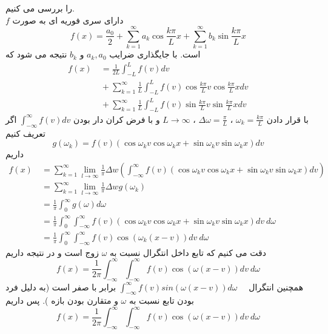 را بررسی می کنیم.\\
$f$
دارای سری فوریه ای به صورت
\[
f(x)=\frac{a_{0}}{2}+\sum_{k=1}^{\infty} a_{k} \cos \frac{k \pi}{L} x+\sum_{k=1}^{\infty} b_{k} \sin \frac{k \pi }{L}x
\]
است. با جایگذاری ضرایب
$a_k,a_0$
و
$b_k$
نتیجه می شود که
\begin{equation*}
	\begin{aligned}
		f(x)
		{} &\
		=\frac{1}{2 L} \int_{-L}^{L} f(v) d v \\ &\ + \sum_{k=1}^{\infty}\frac{1}{ L} \int_{-L}^{L} f(v) \cos \frac{k \pi}{L} v \cos \frac{k \pi}{L}xdv \\ &\ + \sum_{k=1}^{\infty}\frac{1}{ L} \int_{-L}^{L} f(v) \sin \frac{k \pi}{L} v \sin \frac{k \pi}{L}xdv
	\end{aligned}
\end{equation*}
با قرار دادن
$\omega_k=\frac{k\pi}{L}$
،
$\Delta\omega=\frac{\pi}{L}$
،
$L\to\infty$
و با فرض کران دار بودن
$\int_{-\infty}^\infty{f(v)dv}$
اگر تعریف کنیم
\[
g\left(\omega_k\right)=f(v)(\cos  \omega_{k} v \cos  \omega_{k} x+\sin \omega_{k} v \sin \omega_{k} x) d v
\]
داریم
\begin{equation*}
	\begin{aligned}
		f(x) {} &\ =
		\sum_{k=1}^{\infty} \lim _{l\to \infty} \frac{1}{\pi} \Delta w(\int_{-{\infty}}^{{\infty}} f(v)(\cos  \omega_{k} v \cos  \omega_{k} x+\sin \omega_{k} v \sin \omega_{k} x) d v)
		\\ &\
		=\sum_{k=1}^{\infty} \lim _{l \to\infty} \frac{1}{\pi} \Delta w g(\omega_{k}) 
		\\ &\
		= \frac{1}{\pi}\int_{0}^{{\infty}}g(\omega) d\omega
		\\ &\
		= \frac{1}{\pi}\int_{0}^{{\infty}}\int_{-{\infty}}^{{\infty}} f(v)(\cos  \omega_{k} v \cos  \omega_{k} x+\sin \omega_{k} v \sin \omega_{k} x) d v \ d\omega
		\\ &\
		= \frac{1}{\pi}\int_{0}^{{\infty}}\int_{-{\infty}}^{{\infty}} f(v)\cos(  \omega_{k}(x-v) ) d v \ d\omega
	\end{aligned}
\end{equation*}
دقت می کنیم که تابع داخل انتگرال نسبت به
$\omega$
زوج است و در نتیجه داریم
\[
f(x)= \frac{1}{2\pi}\int_{-{\infty}}^{{\infty}}\int_{-{\infty}}^{{\infty}} f(v)\cos(  \omega(x-v) ) d v \ d\omega
\]
همچنین انتگرال
$\int_{-\infty}^\infty{f(v)sin\left(\omega(x-v)\right)d\omega}\quad$
برابر با صفر است (به دلیل فرد بودن تابع نسبت به
$\omega$
و متقارن بودن بازه
).
پس داریم
\begin{equation}
	f(x)= \frac{1}{2\pi}\int_{-{\infty}}^{{\infty}}\int_{-{\infty}}^{{\infty}} f(v)\cos(  \omega(x-v) ) d v \ d\omega
\end{equation}
